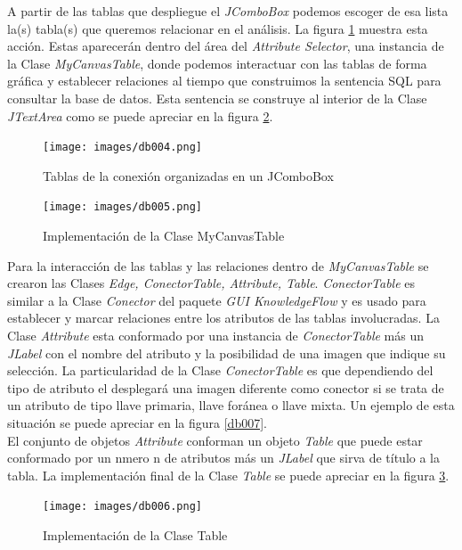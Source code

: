 A partir de las tablas que despliegue el \textit{JComboBox} podemos escoger de esa lista la(s) tabla(s) que
queremos relacionar en el an\'alisis.  La figura \ref{db004} muestra esta acci\'on.  Estas aparecer\'an dentro del
\'area del \textit{Attribute Selector}, una instancia de la Clase \textit{MyCanvasTable}, donde podemos interactuar
con las tablas de forma gr\'afica y establecer relaciones al tiempo que construimos la sentencia SQL para consultar
la base de datos.  Esta sentencia se construye al interior de la Clase \textit{JTextArea} como se puede apreciar en
la figura \ref{db005}.\\

\begin{figure}[!h]
\centering
\texttt{[image: images/db004.png]}
\caption{Tablas de la conexi\'on organizadas en un JComboBox}
\label{db004}
\end{figure}  

\begin{figure}[!h]
\centering
\texttt{[image: images/db005.png]}
\caption{Implementaci\'on de la Clase MyCanvasTable}
\label{db005}
\end{figure}

Para la interacci\'on de las tablas y las relaciones dentro de \textit{MyCanvasTable} se crearon las Clases
\textit{Edge, ConectorTable, Attribute,  Table}.  \textit{ConectorTable} es similar a la Clase \textit{Conector}
del paquete \textit{GUI KnowledgeFlow} y es usado para establecer y marcar relaciones entre los atributos de las
tablas involucradas.  La Clase \textit{Attribute} esta conformado por una instancia de \textit{ConectorTable} m\'as
un \textit{JLabel} con el nombre del atributo y la posibilidad de una imagen que indique su selecci\'on.  La
particularidad de la Clase \textit{ConectorTable} es que dependiendo del tipo de atributo el desplegar\'a una
imagen diferente como conector si se trata de un atributo de tipo llave primaria, llave for\'anea o llave mixta. 
Un ejemplo de esta situaci\'on se puede apreciar en la figura \ref{db007}.\\

El conjunto de objetos \textit{Attribute} conforman un objeto \textit{Table} que puede estar conformado por un
nmero n de atributos m\'as un \textit{JLabel} que sirva de t\'itulo a la tabla.  La implementaci\'on final de la
Clase \textit{Table} se puede apreciar en la figura \ref{db006}.\\

\begin{figure}[ht]
\centering
\texttt{[image: images/db006.png]}         
\caption{Implementaci\'on de la Clase Table}
\label{db006}
\end{figure}  

